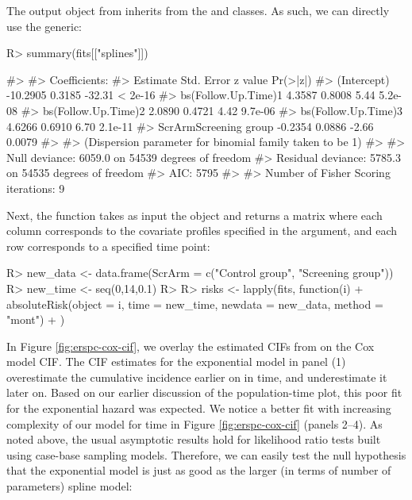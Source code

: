 \documentclass[
]{jss}
\begin{document}
The output object from  inherits from the
 and  classes. As such, we can directly
use the  generic:

\begin{CodeChunk}

\begin{CodeInput}
R> summary(fits[["splines"]]) 
\end{CodeInput}
\end{CodeChunk}

\begin{CodeChunk}

\begin{CodeOutput}
#> 
#> Coefficients:
#>                       Estimate Std. Error z value Pr(>|z|)
#> (Intercept)           -10.2905     0.3185  -32.31  < 2e-16
#> bs(Follow.Up.Time)1     4.3587     0.8008    5.44  5.2e-08
#> bs(Follow.Up.Time)2     2.0890     0.4721    4.42  9.7e-06
#> bs(Follow.Up.Time)3     4.6266     0.6910    6.70  2.1e-11
#> ScrArmScreening group  -0.2354     0.0886   -2.66   0.0079
#> 
#> (Dispersion parameter for binomial family taken to be 1)
#> 
#>     Null deviance: 6059.0  on 54539  degrees of freedom
#> Residual deviance: 5785.3  on 54535  degrees of freedom
#> AIC: 5795
#> 
#> Number of Fisher Scoring iterations: 9
\end{CodeOutput}
\end{CodeChunk}

Next, the  function takes as input the
 object and returns a matrix where each column
corresponds to the covariate profiles specified in the 
argument, and each row corresponds to a specified time point:

\begin{CodeChunk}

\begin{CodeInput}
R> new_data <- data.frame(ScrArm = c("Control group", "Screening group"))
R> new_time <- seq(0,14,0.1)
R> 
R> risks <- lapply(fits, function(i) {
+   absoluteRisk(object = i, time = new_time, newdata = new_data, method = "mont")
+ })
\end{CodeInput}
\end{CodeChunk}

In Figure \ref{fig:erspc-cox-cif}, we overlay the estimated CIFs from
 on the Cox model CIF. The CIF estimates for the
exponential model in panel (1) overestimate the cumulative incidence
earlier on in time, and underestimate it later on. Based on our earlier
discussion of the population-time plot, this poor fit for the
exponential hazard was expected. We notice a better fit with increasing
complexity of our model for time in Figure \ref{fig:erspc-cox-cif}
(panels 2--4). As noted above, the usual asymptotic results hold for
likelihood ratio tests built using case-base sampling models. Therefore,
we can easily test the null hypothesis that the exponential model is
just as good as the larger (in terms of number of parameters) spline
model:
\end{document}
